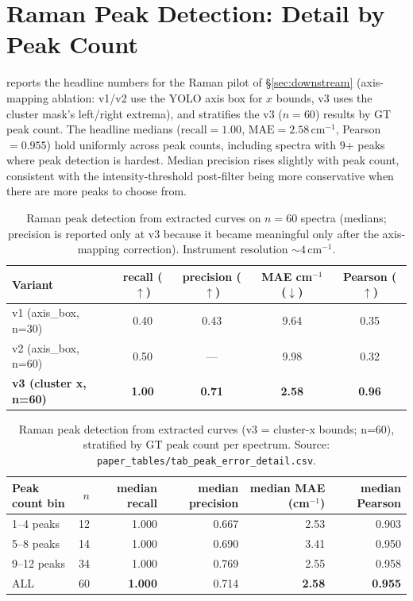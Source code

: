 \documentclass{article}
\begin{document}
\section{Raman Peak Detection: Detail by Peak Count}
\label{app:peak-error-detail}
\setcounter{table}{0}\setcounter{figure}{0}

 reports the headline numbers for the Raman
pilot of \S\ref{sec:downstream} (axis-mapping ablation: v1/v2 use
the YOLO axis box for $x$ bounds, v3 uses the cluster mask's
left/right extrema), and  stratifies
the v3 ($n{=}60$) results by GT peak count. The headline medians
($\mathrm{recall}{=}1.00$, $\mathrm{MAE}{=}2.58$\,cm$^{-1}$,
Pearson${=}0.955$) hold uniformly across peak counts, including
spectra with $9$+ peaks where peak detection is hardest. Median
precision rises slightly with peak count, consistent with the
intensity-threshold post-filter being more conservative when there
are more peaks to choose from.

\begin{table}[h]
\centering
\caption{Raman peak detection from extracted curves on $n{=}60$
spectra (medians; precision is reported only at v3 because it
became meaningful only after the axis-mapping correction).
Instrument resolution ${\sim}4$\,cm$^{-1}$.}
\label{tab:raman-peak}
\small
\begin{tabular}{lcccc}
\toprule
Variant & recall ($\uparrow$) & precision ($\uparrow$) &
MAE cm$^{-1}$ ($\downarrow$) & Pearson ($\uparrow$) \\
\midrule
v1 (axis\_box, n=30)        & 0.40  & 0.43 & 9.64 & 0.35 \\
v2 (axis\_box, n=60)        & 0.50  & ---  & 9.98 & 0.32 \\
\textbf{v3 (cluster x, n=60)} & \textbf{1.00} & \textbf{0.71}
                          & \textbf{2.58} & \textbf{0.96} \\
\bottomrule
\end{tabular}
\end{table}

\begin{table}[h]
\centering
\caption{Raman peak detection from extracted curves
(v3 = cluster-x bounds; n=60), stratified by GT peak count per
spectrum. Source:
\texttt{paper\_tables/tab\_peak\_error\_detail.csv}.}
\label{tab:peak-error-detail}
\small
\begin{tabular}{lrrrrr}
\toprule
Peak count bin & $n$ & median recall & median precision &
median MAE (cm$^{-1}$) & median Pearson \\
\midrule
1--4 peaks   & 12 & 1.000 & 0.667 & 2.53 & 0.903 \\
5--8 peaks   & 14 & 1.000 & 0.690 & 3.41 & 0.950 \\
9--12 peaks  & 34 & 1.000 & 0.769 & 2.55 & 0.958 \\
\midrule
ALL          & 60 & \textbf{1.000} & 0.714 & \textbf{2.58} & \textbf{0.955} \\
\bottomrule
\end{tabular}
\end{table}
\end{document}

